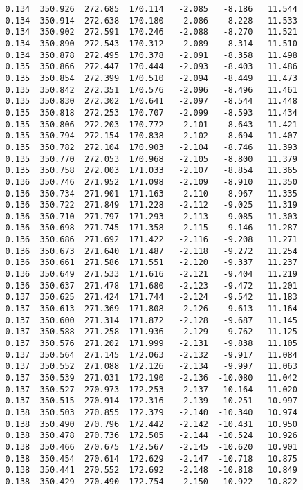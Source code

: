 \begin{verbatim}
   0.134  350.926  272.685  170.114   -2.085   -8.186   11.544
   0.134  350.914  272.638  170.180   -2.086   -8.228   11.533
   0.134  350.902  272.591  170.246   -2.088   -8.270   11.521
   0.134  350.890  272.543  170.312   -2.089   -8.314   11.510
   0.134  350.878  272.495  170.378   -2.091   -8.358   11.498
   0.135  350.866  272.447  170.444   -2.093   -8.403   11.486
   0.135  350.854  272.399  170.510   -2.094   -8.449   11.473
   0.135  350.842  272.351  170.576   -2.096   -8.496   11.461
   0.135  350.830  272.302  170.641   -2.097   -8.544   11.448
   0.135  350.818  272.253  170.707   -2.099   -8.593   11.434
   0.135  350.806  272.203  170.772   -2.101   -8.643   11.421
   0.135  350.794  272.154  170.838   -2.102   -8.694   11.407
   0.135  350.782  272.104  170.903   -2.104   -8.746   11.393
   0.135  350.770  272.053  170.968   -2.105   -8.800   11.379
   0.135  350.758  272.003  171.033   -2.107   -8.854   11.365
   0.136  350.746  271.952  171.098   -2.109   -8.910   11.350
   0.136  350.734  271.901  171.163   -2.110   -8.967   11.335
   0.136  350.722  271.849  171.228   -2.112   -9.025   11.319
   0.136  350.710  271.797  171.293   -2.113   -9.085   11.303
   0.136  350.698  271.745  171.358   -2.115   -9.146   11.287
   0.136  350.686  271.692  171.422   -2.116   -9.208   11.271
   0.136  350.673  271.640  171.487   -2.118   -9.272   11.254
   0.136  350.661  271.586  171.551   -2.120   -9.337   11.237
   0.136  350.649  271.533  171.616   -2.121   -9.404   11.219
   0.136  350.637  271.478  171.680   -2.123   -9.472   11.201
   0.137  350.625  271.424  171.744   -2.124   -9.542   11.183
   0.137  350.613  271.369  171.808   -2.126   -9.613   11.164
   0.137  350.600  271.314  171.872   -2.128   -9.687   11.145
   0.137  350.588  271.258  171.936   -2.129   -9.762   11.125
   0.137  350.576  271.202  171.999   -2.131   -9.838   11.105
   0.137  350.564  271.145  172.063   -2.132   -9.917   11.084
   0.137  350.552  271.088  172.126   -2.134   -9.997   11.063
   0.137  350.539  271.031  172.190   -2.136  -10.080   11.042
   0.137  350.527  270.973  172.253   -2.137  -10.164   11.020
   0.137  350.515  270.914  172.316   -2.139  -10.251   10.997
   0.138  350.503  270.855  172.379   -2.140  -10.340   10.974
   0.138  350.490  270.796  172.442   -2.142  -10.431   10.950
   0.138  350.478  270.736  172.505   -2.144  -10.524   10.926
   0.138  350.466  270.675  172.567   -2.145  -10.620   10.901
   0.138  350.454  270.614  172.629   -2.147  -10.718   10.875
   0.138  350.441  270.552  172.692   -2.148  -10.818   10.849
   0.138  350.429  270.490  172.754   -2.150  -10.922   10.822

\end{verbatim}
